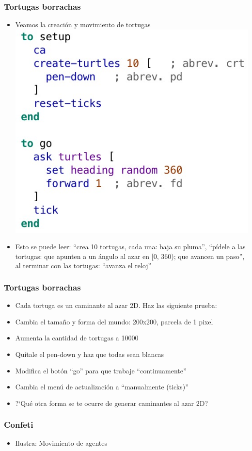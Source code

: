 \documentclass{beamer}
\begin{document}
\begin{frame}[t]
\frametitle{Tortugas borrachas}
\begin{itemize}[<+->]
	\item Veamos la creación y movimiento de tortugas
\includegraphics[width=.5\textwidth]{tortugas_borrachas}
\item Esto se puede leer: ``crea 10 tortugas, cada una: baja su pluma'', ``pídele a las tortugas: que apunten a un ángulo al azar en [0, 360); que avancen un paso'', al terminar con las tortugas: ``avanza el reloj''
\end{itemize}
\end{frame}

\begin{frame}[t]
\frametitle{Tortugas borrachas}
\begin{itemize}[<+->]
	\item Cada tortuga es un caminante al azar 2D. Haz las siguiente prueba:
	\item Cambia el tamaño y forma del mundo: 200x200, parcela de 1 pixel
	\item Aumenta la cantidad de tortugas a 10000
	\item Quítale el pen-down y haz que todas sean blancas
	\item Modifica el botón ``go'' para que trabaje ``continuamente''
	\item Cambia el menú de actualización a ``manualmente (ticks)''
	\item ?`Qué otra forma se te ocurre de generar caminantes al azar 2D?
\end{itemize}
\end{frame}

\begin{frame}[t]
\frametitle{Confeti}
\begin{itemize}[<+->]
	\item Ilustra: Movimiento de agentes
\end{itemize}

\end{frame}
\end{document}

